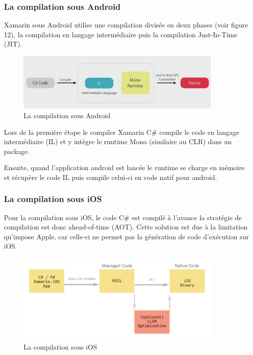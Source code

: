\documentclass[11]{article}
\begin{document}
\subsubsection{La compilation sous Android}
Xamarin sous Android utilise une compilation divisée en deux phases (voir figure 12), la compilation en langage intermédiaire puis la compilation Just-In-Time (JIT).


\begin{figure}[h]
    \centering
    \includegraphics[width=0.9\textwidth]{compilation1}
    \caption{La compilation sous Android}
    \label{bat}
\end{figure}



 \vspace{0.5cm}
 
Lors de la première étape le compiler Xamarin C\# compile le code en langage intermédiaire (IL) et y intègre le runtime Mono (similaire au CLR) dans un package.
 
 \vspace{0.5cm}
 
Ensuite, quand l’application android est lancée le runtime se charge en mémoire et récupère le code IL puis compile celui-ci en code natif pour android.

\subsubsection{La compilation sous iOS}

Pour  la compilation sous iOS, le code C\# est compilé à l’avance la stratégie de compilation est donc ahead-of-time (AOT). Cette solution est due à la limitation qu’impose Apple, car celle-ci ne permet pas la génération de code d’exécution sur iOS.

\begin{figure}[h]
    \centering
    \includegraphics[width=0.9\textwidth]{compilation2}
    \caption{La compilation sous iOS}
    \label{bat}
\end{figure}
\end{document}

